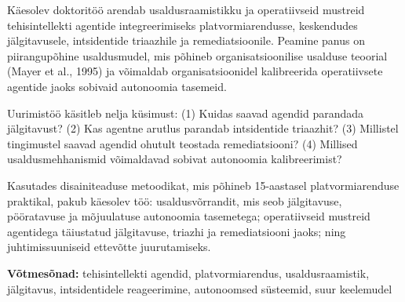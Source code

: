 \documentclass{TTUPhD}
\begin{document}
\begin{abstractet}
Käesolev doktoritöö arendab usaldusraamistikku ja operatiivseid mustreid tehisintellekti agentide integreerimiseks platvormiarendusse, keskendudes jälgitavusele, intsidentide triaazhile ja remediatsioonile. Peamine panus on piirangupõhine usaldus\-mudel, mis põhineb organisatsioonilise usalduse teoorial (Mayer et al., 1995) ja võimaldab organisatsioonidel kalibreerida operatiivsete agentide jaoks sobivaid autonoomia tasemeid.

Uurimistöö käsitleb nelja küsimust: (1) Kuidas saavad agendid parandada jälgitavust? (2) Kas agentne arutlus parandab intsidentide triaazhit? (3) Millistel tingimustel saavad agendid ohutult teostada remediatsiooni? (4) Millised usaldusmehhanismid võimaldavad sobivat autonoomia kalibreerimist?

Kasutades disainiteaduse metoodikat, mis põhineb 15-aastasel platvormiarenduse praktikal, pakub käesolev töö: usaldusvõrrandit, mis seob jälgitavuse, pööratavuse ja mõjuulatuse autonoomia tasemetega; operatiivseid mustreid agentidega täiustatud jälgitavuse, triazhi ja remediatsiooni jaoks; ning juhtimissuuniseid ettevõtte juurutamiseks.

\textbf{Võtmesõnad:} tehisintellekti agendid, platvormiarendus, usaldusraamistik, jälgitavus, intsidentidele reageerimine, autonoomsed süsteemid, suur keele\-mudel
\end{abstractet}
\end{document}
